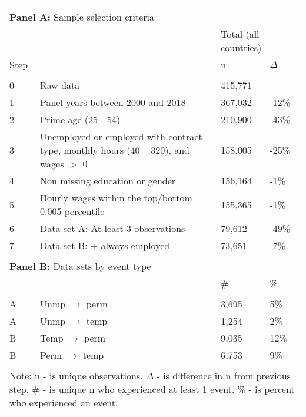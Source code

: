 \begin{tabular}{l>{\raggedright\arraybackslash}p{4in}ll}
   \\[-1.8ex]\toprule \\ 
 [-1.8ex]
\multicolumn{4}{l}{{\bf Panel A:} Sample selection criteria} \\ 

&  & 
\multicolumn{2}{l}{Total (all countries)}
\\  
 
 
\multicolumn{1}{l}{Step} & 
\multicolumn{1}{l}{Description} 
& n & $\Delta$
\\ 
\cmidrule(lr){1-2}
\cmidrule(lr){3-4}
\\[-1.8ex]  
 
0 & Raw data & 415,771 &  \\ 
  1 & Panel years between 2000 and 2018 & 367,032 & -12\% \\ 
  2 & Prime age (25 - 54) & 210,900 & -43\% \\ 
  3 & Unemployed or employed with contract type, monthly hours (40 -- 320), and wages $>$ 0 & 158,005 & -25\% \\ 
  4 & Non missing education or gender & 156,164 & -1\% \\ 
  5 & Hourly wages within the top/bottom 0.005 percentile & 155,365 & -1\% \\ 
  6 & Data set A: At least 3 observations & 79,612 & -49\% \\ 
  7 & Data set B: + always employed & 73,651 & -7\% \\ 
   
\hline \\[-1.8ex]  
 
\multicolumn{4}{l}{{\bf Panel B:} Data sets by event type} \\ 

& & 
\# & \%
\\ 
\cmidrule(lr){1-2}
\cmidrule(lr){3-4}
\\[-1.8ex]  
 
A & Unmp $\rightarrow$ perm & 3,695 & 5\% \\ 
  A & Unmp $\rightarrow$ temp & 1,254 & 2\% \\ 
  B & Temp $\rightarrow$ perm & 9,035 & 12\% \\ 
  B & Perm $\rightarrow$ temp & 6,753 & 9\% \\ 
   \bottomrule \\[-1.8ex] \multicolumn{4}{p{6in}}{Note: n - is unique observations.  $\Delta$ - is difference in n from previous step.  \# - is unique n who experienced at least 1 event.  \% - is percent who experienced an event.} 
\end{tabular}

